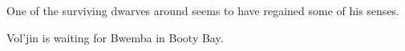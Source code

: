 

One of the surviving dwarves around seems to have regained some of his senses.


 Vol'jin is waiting for Bwemba in Booty Bay.  %




